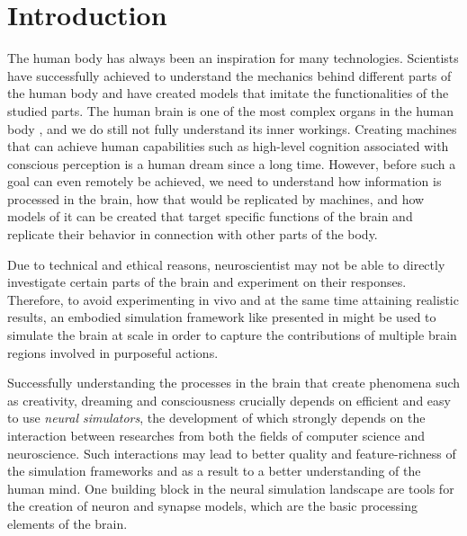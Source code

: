 \chapter{Introduction}


The human body has always been an inspiration for many technologies. Scientists have successfully achieved to understand the mechanics behind different parts of the human body and have created models that imitate the functionalities of the studied parts. The human brain is one of the most complex organs in the human body \citep{nolte2002human}, and we do still not fully understand its inner workings. Creating machines that can achieve human capabilities such as high-level cognition associated with conscious perception is a human dream since a long time. However, before such a goal can even remotely be achieved, we need to understand how information is processed in the brain, how that would be replicated by machines, and how models of it can be created that target specific functions of the brain and replicate their behavior in connection with other parts of the body.

Due to technical and ethical reasons, neuroscientist may not be able to directly investigate certain parts of the brain and experiment on their responses. Therefore, to avoid experimenting in vivo and at the same time attaining realistic results, an embodied simulation framework like presented in \citet{10.3389/fninf.2022.884180} might be used to simulate the brain at scale in order to capture the contributions of multiple brain regions involved in purposeful actions.

Successfully understanding the processes in the brain that create phenomena such as creativity, dreaming and consciousness crucially depends on efficient and easy to use \emph{neural simulators}, the development of which strongly depends on the interaction between researches from both the fields of computer science and neuroscience. Such interactions may lead to better quality and feature-richness of the simulation frameworks and as a result to a better understanding of the human mind. One building block in the neural simulation landscape are tools for the creation of neuron and synapse models, which are the basic processing elements of the brain. 

